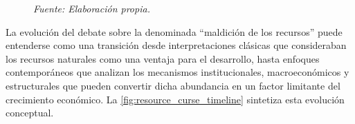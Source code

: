 \documentclass[../../PTFM.tex]{subfiles}
\begin{document}
	\begin{figure}[H]
		\centering

		\caption[Construcción del panel de datos]{Diagrama metodológico del proceso de construcción del panel de datos utilizado en el análisis empírico.}

		\label{fig:diagrama_panel}
		\caption*{\footnotesize \textit{Fuente: Elaboración propia.}}
	\end{figure}

	La evolución del debate sobre la denominada “maldición de los recursos” puede entenderse como una transición desde interpretaciones clásicas
	que consideraban los recursos naturales como una ventaja para el desarrollo, hasta enfoques contemporáneos que analizan los mecanismos institucionales,
	macroeconómicos y estructurales que pueden convertir dicha abundancia en un factor limitante del crecimiento económico. La \autoref{fig:resource_curse_timeline} sintetiza esta evolución conceptual.
\end{document}
